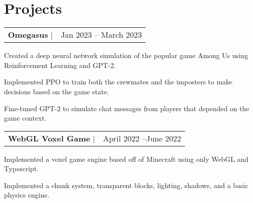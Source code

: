 \documentclass[letterpaper,11pt]{article}
\makeatletter
\newcommand{\resumeSubheadingShort}[3]{
  \begin{tabular*}{0.97\textwidth}[t]{l@{\extracolsep{\fill}}r}
    \textbf{#1} $\vert$ \raisebox{1pt}{\small{#2}} & #3 \\
  \end{tabular*}
}
\newenvironment{resumeSubheadingList}
{\begin{itemize}[leftmargin=0.1in, label={}, noitemsep, topsep=0pt]}
{\end{itemize}}
\newenvironment{resumeListBulleted}[1][0.17in]
{\begin{itemize}[leftmargin=#1, noitemsep, topsep=0pt]\begin{small}}
{\end{small}\end{itemize}}
\newcommand{\link}[2]{\color{blue}{\href{#1}{\underline{#2}}}}
\makeatother
\begin{document}
\section{Projects}
\begin{resumeSubheadingList}
  \item
    \resumeSubheadingShort
    {Omegasus} {\link{https://github.com/pimpale/omegasus}{github.com/pimpale/omegasus}} {Jan 2023 -- March 2023}
    \begin{resumeListBulleted}
      \item Created a deep neural network simulation of the popular game Among Us using Reinforcement Learning and GPT-2.
      \item Implemented PPO to train both the crewmates and the imposters to make decisions based on the game state. 
      \item Fine-tuned GPT-2 to simulate chat messages from players that depended on the game context.
    \end{resumeListBulleted}
  \item
    \resumeSubheadingShort
    {WebGL Voxel Game} {\link{https://github.com/pimpale/webgl-voxel-game}{github.com/pimpale/webgl-voxel-game}} {April 2022 --June 2022}
    \begin{resumeListBulleted}
      \item Implemented a voxel game engine based off of Minecraft using only WebGL and Typescript. 
      \item Implemented a chunk system, transparent blocks, lighting, shadows, and a basic physics engine.
    \end{resumeListBulleted}

\end{resumeSubheadingList}


\end{document}

